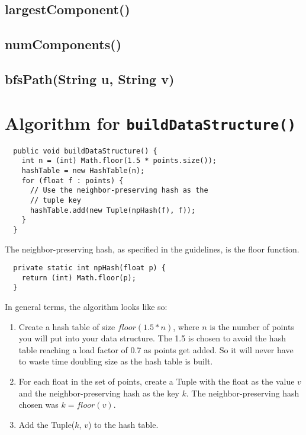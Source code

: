 \documentclass[12pt]{article}
\begin{document}
\subsection{largestComponent()}

\subsection{numComponents()}

\subsection{bfsPath(String u, String v)}






\noindent\makebox[\linewidth]{\rule{\paperwidth}{0.4pt}}








\section{Algorithm for
  \lstinline[basicstyle=\ttfamily\Large]
  |buildDataStructure()|}

\begin{lstlisting}
  public void buildDataStructure() {
    int n = (int) Math.floor(1.5 * points.size());
    hashTable = new HashTable(n);
    for (float f : points) {
      // Use the neighbor-preserving hash as the
      // tuple key
      hashTable.add(new Tuple(npHash(f), f));
    }
  }
\end{lstlisting}

The neighbor-preserving hash, as specified in the guidelines, is the
floor function. \\

\begin{lstlisting}
  private static int npHash(float p) {
    return (int) Math.floor(p);
  }
\end{lstlisting}

In general terms, the algorithm looks like so: \\

\begin{enumerate}
\item Create a hash table of size $floor(1.5 * n)$, where $n$ is the
  number of points you will put into your data structure. The 1.5 is
  chosen to avoid the hash table reaching a load factor of 0.7
  as points get added. So it will never have to waste time doubling
  size as the hash table is built.
\item For each float in the set of points, create a Tuple with the
  float as the value $v$ and the neighbor-preserving hash as the
  key $k$. The neighbor-preserving hash chosen was $k = floor(v)$.
  \item Add the Tuple($k$, $v$) to the hash table.
  \end{enumerate}
\end{document}
